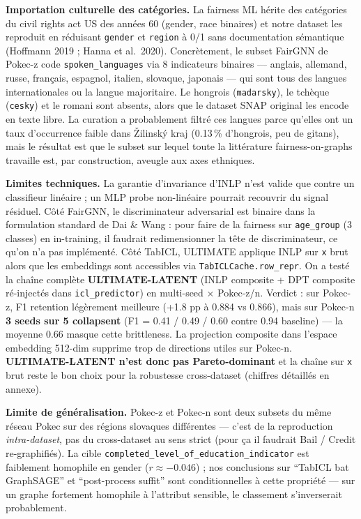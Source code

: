 \documentclass[10pt,a4paper]{article}
\begin{document}
\textbf{Importation culturelle des catégories.} La fairness ML hérite des
catégories du civil rights act US des années 60 (gender, race binaires) et
notre dataset les reproduit en réduisant \texttt{gender} et \texttt{region}
à 0/1 sans documentation sémantique (Hoffmann 2019 ; Hanna et al.\ 2020).
Concrètement, le subset FairGNN de Pokec-z code \texttt{spoken\_languages}
via 8 indicateurs binaires — anglais, allemand, russe, français, espagnol,
italien, slovaque, japonais — qui sont tous des langues internationales ou
la langue majoritaire. Le hongrois (\texttt{madarsky}), le tchèque
(\texttt{cesky}) et le romani sont absents, alors que le dataset SNAP
original les encode en texte libre. La curation a probablement filtré ces
langues parce qu'elles ont un taux d'occurrence faible dans Žilinský kraj
(0.13\,\% d'hongrois, peu de gitans), mais le résultat est que le subset sur
lequel toute la littérature fairness-on-graphs travaille est, par
construction, aveugle aux axes ethniques.

\textbf{Limites techniques.} La garantie d'invariance d'INLP n'est valide
que contre un classifieur linéaire ; un MLP probe non-linéaire pourrait
recouvrir du signal résiduel. Côté FairGNN, le discriminateur adversarial
est binaire dans la formulation standard de Dai \& Wang : pour faire de la
fairness sur \texttt{age\_group} (3 classes) en in-training, il faudrait
redimensionner la tête de discriminateur, ce qu'on n'a pas implémenté.
Côté TabICL, ULTIMATE applique INLP sur \texttt{x} brut alors que les
embeddings sont accessibles via \texttt{TabICLCache.row\_repr}. On a testé
la chaîne complète \textbf{ULTIMATE-LATENT} (INLP composite + DPT
composite ré-injectés dans \texttt{icl\_predictor}) en multi-seed $\times$
Pokec-z/n. Verdict : sur Pokec-z, F1 retention légèrement meilleure
(+1.8 pp à 0.884 vs 0.866), mais sur Pokec-n \textbf{3 seeds sur 5
collapsent} (F1 = 0.41 / 0.49 / 0.60 contre 0.94 baseline) — la moyenne
0.66 masque cette brittleness. La projection composite dans l'espace
embedding 512-dim supprime trop de directions utiles sur Pokec-n.
\textbf{ULTIMATE-LATENT n'est donc pas Pareto-dominant} et la chaîne
sur \texttt{x} brut reste le bon choix pour la robustesse cross-dataset
(chiffres détaillés en annexe).

\textbf{Limite de généralisation.} Pokec-z et Pokec-n sont deux subsets
du même réseau Pokec sur des régions slovaques différentes — c'est de la
reproduction \emph{intra-dataset}, pas du cross-dataset au sens strict
(pour ça il faudrait Bail / Credit re-graphifiés). La cible
\texttt{completed\_level\_of\_education\_indicator} est faiblement
homophile en gender ($r \approx -0.046$) ; nos conclusions sur ``TabICL
bat GraphSAGE'' et ``post-process suffit'' sont conditionnelles à cette
propriété — sur un graphe fortement homophile à l'attribut sensible, le
classement s'inverserait probablement.
\end{document}
